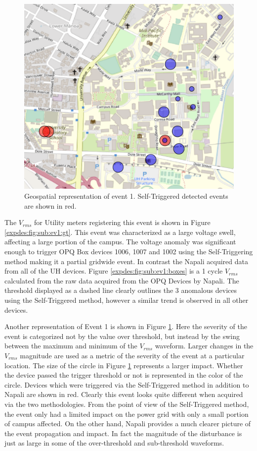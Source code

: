 \begin{figure}[!ht]
    \centering
    \includegraphics[width=0.7\linewidth]{img/napali_eval/subthreshold/ev1/map.pdf}
    \caption{Geospatial representation of event 1.
    Self-Triggered detected events are shown in red.}
    \label{expdes:fig:sub:ev1:map}
\end{figure}

The $V_{rms}$ for Utility meters registering this event is shown in Figure \ref{expdes:fig:sub:ev1:gt}.
This event was characterized as a large voltage swell, affecting a large portion of the campus.
The voltage anomaly was significant enough to trigger OPQ Box devices 1006, 1007 and 1002 using the Self-Triggering method making it a partial gridwide event.
In contrast the Napali acquired data from  all of the UH devices.
Figure \ref{expdes:fig:sub:ev1:boxes} is a 1 cycle $V_{rms}$ calculated from the raw data acquired from the OPQ Devices by Napali.
The threshold displayed as a dashed line clearly outlines the 3 anomalous devices using the Self-Triggered method, however a similar trend is observed in all other devices.

Another representation of Event 1 is shown in Figure \ref{expdes:fig:sub:ev1:map}.
Here the severity of the event is categorized not by the value over threshold, but instead by the swing between the maximum and minimum of the $V_{rms}$ waveform.
Larger changes in the $V_{rms}$ magnitude are used as a metric of the severity of the event at a particular location.
The size of the circle  in Figure \ref{expdes:fig:sub:ev1:map} represents a larger impact.
Whether the device passed the trigger threshold or not is represented in the color of the circle.
Devices which were triggered via the Self-Triggered method in addition to Napali are shown in red.
Clearly this event looks quite different when acquired via the two methodologies.
From the point of view of the Self-Triggered method, the event only had a limited impact on the power grid with only a small portion of campus affected.
On the other hand, Napali provides a much clearer picture of the event propagation and impact.
In fact the magnitude of the disturbance is just as large in some of the over-threshold and sub-threshold waveforms.
